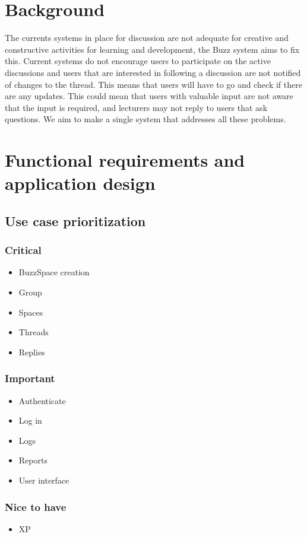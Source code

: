 \documentclass[pdftex,10pt,a4paper]{report}
\begin{document}
\chapter{Background}


The currents systems in place for discussion are not adequate for creative and constructive activities for learning and development, the Buzz system aims to fix this. Current systems do not encourage users to participate on the active discussions and users that are interested in following a discussion are not notified of changes to the thread. This means that users will have to go and check if there are any updates.  This could mean that users with valuable input are not aware that the input is required, and lecturers may not reply to users that ask questions. We aim to make a single system that addresses all these problems.

\chapter{ Functional requirements and application design}
	\section{Use case prioritization}
		\subsection{Critical}
		
\begin{itemize}
\item	BuzzSpace creation
\item	Group
\item	Spaces
\item	Threads 
\item	Replies
\end{itemize} 

		\subsection{Important}
\begin{itemize}
\item		Authenticate
\item	Log in
\item	Logs
\item	Reports
\item	User interface
\end{itemize} 
		
		
		\subsection{Nice to have}
\begin{itemize}
\item	XP
\end{itemize} 
		
\end{document}
